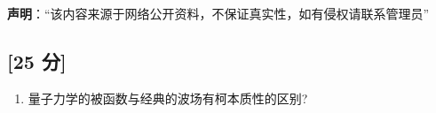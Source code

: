 
\textbf{声明}：“该内容来源于网络公开资料，不保证真实性，如有侵权请联系管理员”

\subsection{[25 分]}
\begin{enumerate}
\item 量子力学的被函数与经典的波场有柯本质性的区别?
\end{enumerate}

